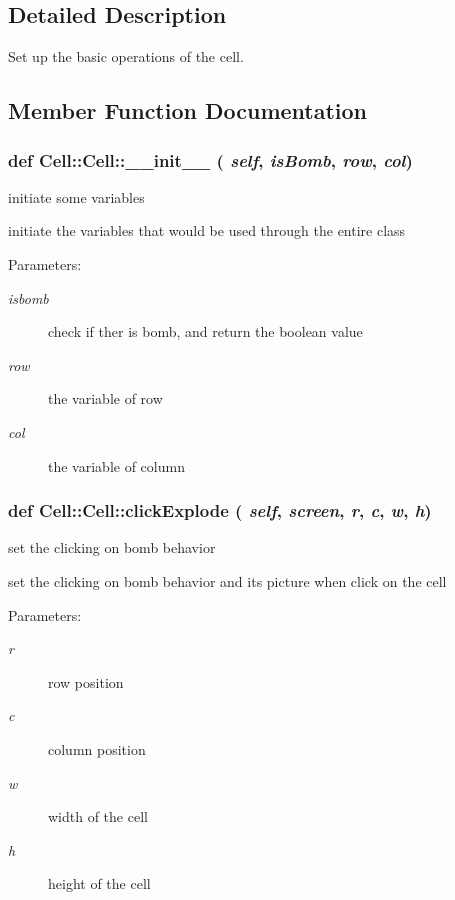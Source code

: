 \subsection{Detailed Description}
Set up the basic operations of the cell. 



\subsection{Member Function Documentation}
\subsubsection{\setlength{\rightskip}{0pt plus 5cm}def Cell::Cell::\_\-\_\-init\_\-\_\- ( {\em self},  {\em is\-Bomb},  {\em row},  {\em col})}\label{classCell_1_1Cell_fb50d9e03be9c8ead355cb830774dd59}


initiate some variables 

initiate the variables that would be used through the entire class \begin{Desc}
\item[Parameters:]
\begin{description}
\item[{\em isbomb}]check if ther is bomb, and return the boolean value \item[{\em row}]the variable of row \item[{\em col}]the variable of column \end{description}
\end{Desc}
\subsubsection{\setlength{\rightskip}{0pt plus 5cm}def Cell::Cell::click\-Explode ( {\em self},  {\em screen},  {\em r},  {\em c},  {\em w},  {\em h})}\label{classCell_1_1Cell_9619239359e0725edb898332130627f7}


set the clicking on bomb behavior 

set the clicking on bomb behavior and its picture when click on the cell \begin{Desc}
\item[Parameters:]
\begin{description}
\item[{\em r}]row position \item[{\em c}]column position \item[{\em w}]width of the cell \item[{\em h}]height of the cell \end{description}
\end{Desc}
